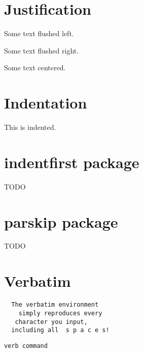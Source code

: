 \documentclass{article}
\begin{document}
  \section{Justification}

  \begin{flushleft}Some text flushed left.\end{flushleft}

  \begin{flushright}Some text flushed right.\end{flushright}

  \begin{center}
    Some text centered.
  \end{center}

  \section{Indentation}

  \indent This is indented.

  \section{indentfirst package}
  TODO

  \section{parskip package}
  TODO

  \section{Verbatim}

  \begin{verbatim}
  The verbatim environment
    simply reproduces every
   character you input,
  including all  s p a c e s!
  \end{verbatim}

  \verb+verb command+
\end{document}
